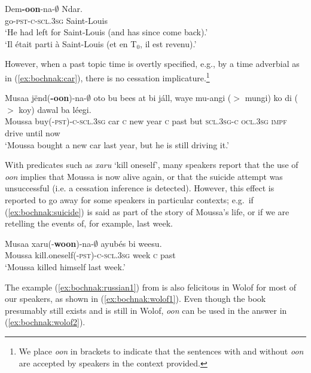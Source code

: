 \documentclass[output=paper,newtxmath,modfonts,nonflat,draftmode]{langsci/langscibook}
\begin{document}
\ea
\gll\label{leave2-rep}Dem\textbf{-oon}-na-$\emptyset$ Ndar.\\
go-\textsc{pst-c-scl.3sg} Saint-Louis\\
\glt `He had left for Saint-Louis (and has since come back).'\\`Il \'etait parti \`a Saint-Louis (et en T$_0$,
  il est revenu).' \hfill \citep[279]{robert91approche}
\z

However, when a past topic time is overtly specified, e.g., by a time adverbial as in (\ref{ex:bochnak:car}), there is no cessation implicature.\footnote{We place \textit{oon} in brackets to indicate that the sentences with and without \textit{oon} are accepted by speakers in the context provided.}

\ea\label{ex:bochnak:car}
\gll Musaa j\"end(\textbf{-oon})-na-$\emptyset$ oto bu bees at bi j\'all, waye mu-{angi ($>$ mungi)} ko {di ($>$ koy)} dawal ba l\'eegi.\\
Moussa buy(-\textsc{pst})-\textsc{c}-\textsc{scl.3sg} car \textsc{c} new year \textsc{c} past but \textsc{scl.3sg}-\textsc{c} \textsc{ocl.3sg} \textsc{impf} drive until now\\
\glt `Moussa bought a new car last year, but he is still driving it.' 
\z

With predicates such as \textit{xaru} `kill oneself', many speakers
report that the use of \textit{oon} implies that Moussa is now alive
again, or that the suicide attempt was unsuccessful (i.e. a cessation
inference is detected). However, this effect is reported to go away
for some speakers in
particular contexts; e.g.~if
(\ref{ex:bochnak:suicide}) is said as part of the story of Moussa's life, or if
we are retelling the events of, for example, last week.

\ea\label{ex:bochnak:suicide}
\gll Musaa xaru(-\textbf{woon})-na-$\emptyset$ ayub\'es bi weesu.\\
Moussa kill.oneself\textsc{(-pst)-c-scl.3sg} week \textsc{c} past\\
\glt `Moussa killed himself last week.'
\z

The example (\ref{ex:bochnak:russian1}) from \cite{klein94time} is also felicitous in Wolof for most
of our speakers, as shown in (\ref{ex:bochnak:wolof1}). Even though the book
presumably still exists and is still in Wolof,  \textit{oon} can be
used in the answer in (\ref{ex:bochnak:wolof2}).
\end{document}
